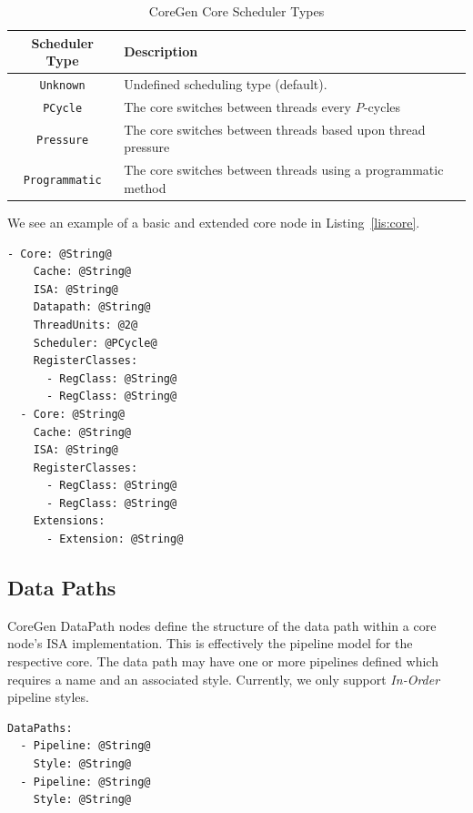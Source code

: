 \documentclass{article}
\begin{document}
\begin{table}[h]
\begin{center}
\caption{CoreGen Core Scheduler Types}
\vspace{0.125in}
\label{tab:SchedTypes}
\begin{tabular}{|c|l|}
\hline
\textbf{Scheduler Type} & \textbf{Description}\\
\hline
\texttt{Unknown} & Undefined scheduling type (default).\\
\hline
\texttt{PCycle} & The core switches between threads every \textit{P}-cycles\\
\hline
\texttt{Pressure} & The core switches between threads based upon thread pressure\\
\hline
\texttt{Programmatic} & The core switches between threads using a programmatic method\\
\hline
\end{tabular}
\end{center}
\end{table}

\clearpage
We see an example of a basic and extended core node in Listing~\ref{lis:core}.   

\vspace{0.125in}
\begin{lstlisting}[frame=single,style=base,caption={Core Node Definition},captionpos=b,label={lis:core}]
- Core: @String@
    Cache: @String@
    ISA: @String@
    Datapath: @String@
    ThreadUnits: @2@
    Scheduler: @PCycle@
    RegisterClasses:
      - RegClass: @String@
      - RegClass: @String@
  - Core: @String@
    Cache: @String@
    ISA: @String@
    RegisterClasses:
      - RegClass: @String@
      - RegClass: @String@
    Extensions:
      - Extension: @String@
\end{lstlisting}

\clearpage
\subsection{Data Paths}
\label{sec:DataPathNodes}

CoreGen DataPath nodes define the structure of the data path within a core node's 
ISA implementation.  This is effectively the pipeline model for the respective core.  The data path 
may have one or more pipelines defined which requires a name and an associated style.  Currently, 
we only support \textit{In-Order} pipeline styles.

\vspace{0.125in}
\begin{lstlisting}[frame=single,style=base,caption={Data Path Node Definition},captionpos=b,label={lis:datapath}]
DataPaths:
  - Pipeline: @String@
    Style: @String@
  - Pipeline: @String@
    Style: @String@
\end{lstlisting}
\end{document}
